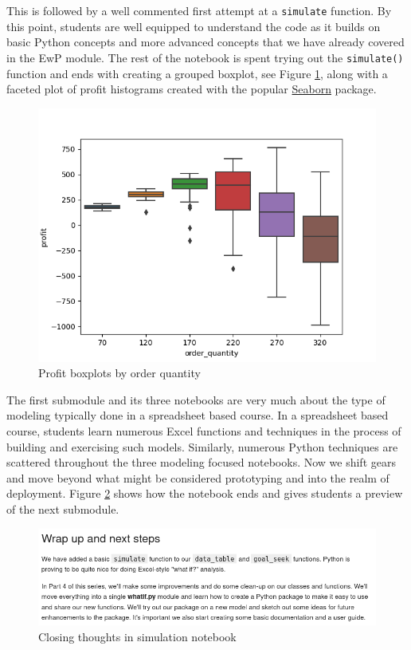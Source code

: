 \documentclass[ited,blindrev]{informs3}              %
\newcommand{\code}[1]{\texttt{#1}}
\begin{document}
This is followed by a well commented first attempt at a \code{simulate} function. By this point, students are well equipped to understand the code as it builds on basic Python concepts and more advanced concepts that we have already covered in the EwP module. The rest of the notebook is spent trying out the \code{simulate()} function and ends with creating a grouped boxplot, see Figure \ref{fig:boxplot}, along with a faceted plot of profit histograms created with the popular \href{https://seaborn.pydata.org/}{Seaborn} package.

\begin{figure}[!htbp]
\centering
\includegraphics[width=1.0\textwidth]{boxplots}
\caption{Profit boxplots by order quantity}
\label{fig:boxplot}
\end{figure}

The first submodule and its three notebooks are very much about the type of modeling typically done in a spreadsheet based course. In a spreadsheet based course, students learn numerous Excel functions and techniques in the process of building and exercising such models. Similarly, numerous Python techniques are scattered throughout the three modeling focused notebooks. Now we shift gears and move beyond what might be considered prototyping and into the realm of deployment. Figure \ref{fig:sim_wrapup} shows how the notebook ends and gives students a preview of the next submodule.

\begin{figure}[!htbp]
\centering
\includegraphics[scale=0.5]{sim_wrapup}
\caption{Closing thoughts in simulation notebook}
\label{fig:sim_wrapup}
\end{figure}
\end{document}
